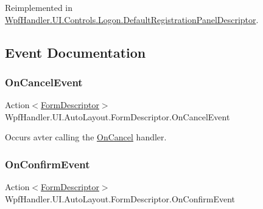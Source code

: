 Reimplemented in \mbox{\hyperlink{class_wpf_handler_1_1_u_i_1_1_controls_1_1_logon_1_1_default_registration_panel_descriptor_abc8055d00358a941e9b507fed58ff662}{Wpf\+Handler.\+U\+I.\+Controls.\+Logon.\+Default\+Registration\+Panel\+Descriptor}}.



\subsection{Event Documentation}
\mbox{\label{class_wpf_handler_1_1_u_i_1_1_auto_layout_1_1_form_descriptor_a5be99456050a10453139bf7a27baa78a}} 
\subsubsection{\texorpdfstring{On\+Cancel\+Event}{OnCancelEvent}}
{\footnotesize\ttfamily Action$<$\mbox{\hyperlink{class_wpf_handler_1_1_u_i_1_1_auto_layout_1_1_form_descriptor}{Form\+Descriptor}}$>$ Wpf\+Handler.\+U\+I.\+Auto\+Layout.\+Form\+Descriptor.\+On\+Cancel\+Event}



Occurs avter calling the \mbox{\hyperlink{class_wpf_handler_1_1_u_i_1_1_auto_layout_1_1_form_descriptor_a4bbe131238be232c253ca4c65e8493f4}{On\+Cancel}} handler. 

\mbox{\label{class_wpf_handler_1_1_u_i_1_1_auto_layout_1_1_form_descriptor_a8a95b91b04aec2b3e109845866c25fb2}} 
\subsubsection{\texorpdfstring{On\+Confirm\+Event}{OnConfirmEvent}}
{\footnotesize\ttfamily Action$<$\mbox{\hyperlink{class_wpf_handler_1_1_u_i_1_1_auto_layout_1_1_form_descriptor}{Form\+Descriptor}}$>$ Wpf\+Handler.\+U\+I.\+Auto\+Layout.\+Form\+Descriptor.\+On\+Confirm\+Event}



